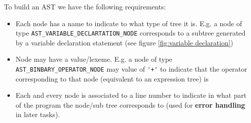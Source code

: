 To build an AST we have the following requirements:
\begin{itemize}
	\item Each node has a name to indicate to what type of tree it is. E.g. a node of type 
	      \verb!AST_VARIABLE_DECLARTATION_NODE! corresponds to a subtree generated by a variable declaration statement (see figure \ref{fig:variable declaration})
	\item Node may have a value/lexeme. E.g. a node of type  \verb!AST_BINBARY_OPERATOR_NODE! may value of \verb!'+'! to indicate that the operator corresponding to that node (equivalent to an expression tree) is 
	\item Each and every node is associated to a line number to indicate in what part of the program the node/sub tree  corresponds to (used for \textbf{error handling} in later tasks).
\end{itemize}

